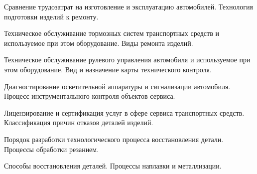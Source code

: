 \documentclass[
	14pt,
	a4paper,
	]
	{scrartcl}
\begin{document}
\vfill

\newpage


\shapk
{}
\setcounter{zad}{0}

\vfill
\z Сравнение трудозатрат на изготовление и эксплуатацию автомобилей.
 \vfill
\z Технология подготовки изделий к ремонту.
 \vfill

\vfill

\newpage


\shapk
{}
\setcounter{zad}{0}

\vfill
\z Техническое обслуживание тормозных систем транспортных средств и используемое при этом оборудование.
 \vfill
\z Виды ремонта изделий.
 \vfill

\vfill

\newpage


\shapk
{}
\setcounter{zad}{0}

\vfill
\z Техническое обслуживание рулевого управления автомобиля и используемое при этом оборудование.
 \vfill
\z Вид и назначение карты технического контроля.
 \vfill

\vfill

\newpage


\shapk
{}
\setcounter{zad}{0}

\vfill
\z Диагностирование осветительной аппаратуры и сигнализации автомобиля.
 \vfill
\z Процесс инструментального контроля объектов сервиса.
 \vfill

\vfill

\newpage


\shapk
{}
\setcounter{zad}{0}

\vfill
\z Лицензирование и сертификация услуг в сфере сервиса транспортных средств.
 \vfill
\z Классификация причин отказов деталей изделий.
 \vfill

\vfill

\newpage


\shapk
{}
\setcounter{zad}{0}

\vfill
\z Порядок разработки технологического процесса восстановления детали.
 \vfill
\z Процессы обработки резанием.
 \vfill

\vfill

\newpage


\shapk
{}
\setcounter{zad}{0}

\vfill
\z Способы восстановления деталей.
 \vfill
\z Процессы наплавки и металлизации.
 \vfill
\end{document}
